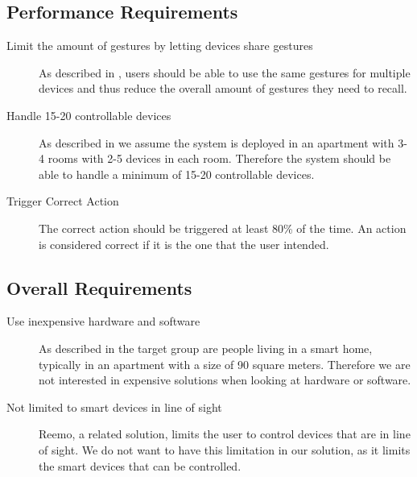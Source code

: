 \subsection{Performance Requirements}

\begin{description}
\item[Limit the amount of gestures by letting devices share gestures] As described in , users should be able to use the same gestures for multiple devices and thus reduce the overall amount of gestures they need to recall.
\item[Handle 15-20 controllable devices] As described in  we assume the system is deployed in an apartment with 3-4 rooms with 2-5 devices in each room. Therefore the system should be able to handle a minimum of 15-20 controllable devices.
\item[Trigger Correct Action] The correct action should be triggered at least 80\% of the time. An action is considered correct if it is the one that the user intended.
\end{description}

\subsection{Overall Requirements}

\begin{description}
\item[Use inexpensive hardware and software] As described in  the target group are people living in a smart home, typically in an apartment with a size of 90 square meters. Therefore we are not interested in expensive solutions when looking at hardware or software.
\item[Not limited to smart devices in line of sight] Reemo, a related solution, limits the user to control devices that are in line of sight. We do not want to have this limitation in our solution, as it limits the smart devices that can be controlled.
\end{description}

